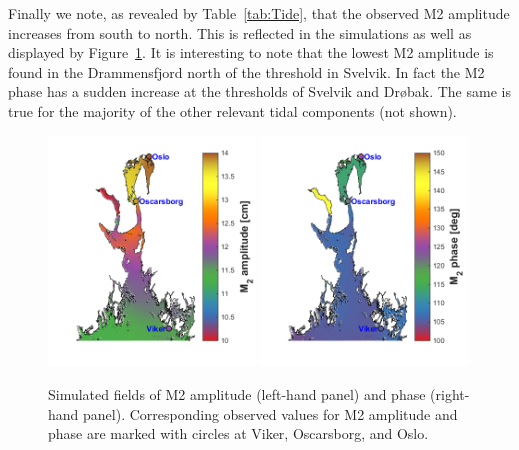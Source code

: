 Finally we note, as revealed by Table~\ref{tab:Tide}, that the observed M2 amplitude increases from south to north. This is reflected in the simulations as well as displayed by Figure~\ref{fig:M2field}. It is interesting to note that the lowest M2 amplitude is found in the Drammensfjord north of the threshold in Svelvik. In fact the M2 phase has a sudden increase at the thresholds of Svelvik and Dr{\o}bak. The same is true for the majority of the other relevant tidal components (not shown).

\begin{figure}[hb] 
	\centerline{ 
		\includegraphics*[trim=1cm 0cm 0cm 0cm,clip=true,width=0.49\textwidth]{Figurer/M2amp_felt}  
		\includegraphics*[trim=0.8cm 0cm 0cm 0cm,clip=true,width=0.49\textwidth]{Figurer/M2fase_felt} 
		} 
	\caption{\small Simulated fields of M2 amplitude (left-hand panel) and phase (right-hand panel). Corresponding observed values for M2 amplitude and phase are marked with circles at Viker, Oscarsborg, and Oslo.} 
	\label{fig:M2field} 
\end{figure} 



\clearpage 
